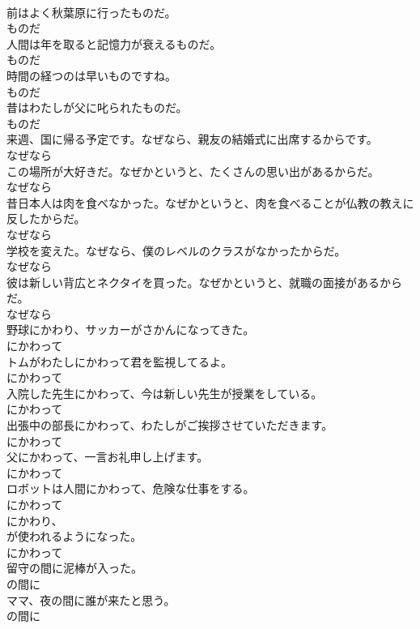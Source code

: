 \documentclass[8pt]{extreport}
\begin{document}
\begin{CJK}{UTF8}{min}
\\	前はよく秋葉原に行ったものだ。	
\\	ものだ
\\	人間は年を取ると記憶力が衰えるものだ。	
\\	ものだ
\\	時間の経つのは早いものですね。	
\\	ものだ
\\	昔はわたしが父に叱られたものだ。	
\\	ものだ
\\	来週、国に帰る予定です。なぜなら、親友の結婚式に出席するからです。	
\\	なぜなら
\\	この場所が大好きだ。なぜかというと、たくさんの思い出があるからだ。	
\\	なぜなら
\\	昔日本人は肉を食べなかった。なぜかというと、肉を食べることが仏教の教えに反したからだ。	
\\	なぜなら
\\	学校を変えた。なぜなら、僕のレベルのクラスがなかったからだ。	
\\	なぜなら
\\	彼は新しい背広とネクタイを買った。なぜかというと、就職の面接があるからだ。	
\\	なぜなら
\\	野球にかわり、サッカーがさかんになってきた。	
\\	にかわって
\\	トムがわたしにかわって君を監視してるよ。	
\\	にかわって
\\	入院した先生にかわって、今は新しい先生が授業をしている。	
\\	にかわって
\\	出張中の部長にかわって、わたしがご挨拶させていただきます。	
\\	にかわって
\\	父にかわって、一言お礼申し上げます。	
\\	にかわって
\\	ロボットは人間にかわって、危険な仕事をする。	
\\	にかわって
\\	にかわり、
\\	が使われるようになった。	
\\	にかわって
\\	留守の間に泥棒が入った。	
\\	の間に
\\	ママ、夜の間に誰が来たと思う。	
\\	の間に

\end{CJK}
\end{document}
